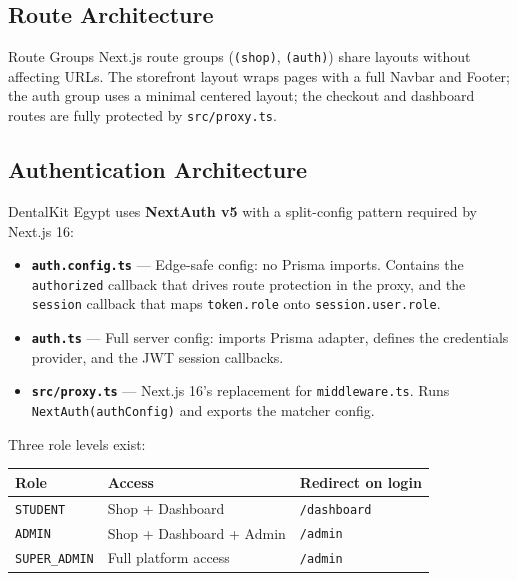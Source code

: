\documentclass[12pt, a4paper]{article}
\begin{document}
\subsection{Route Architecture}

\begin{infobox}{Route Groups}
Next.js route groups (\texttt{(shop)}, \texttt{(auth)}) share layouts without affecting URLs. The storefront layout wraps pages with a full Navbar and Footer; the auth group uses a minimal centered layout; the checkout and dashboard routes are fully protected by \texttt{src/proxy.ts}.
\end{infobox}

\subsection{Authentication Architecture}

DentalKit Egypt uses \textbf{NextAuth v5} with a split-config pattern required by Next.js 16:

\begin{itemize}[leftmargin=*]
  \item \textbf{\texttt{auth.config.ts}} — Edge-safe config: no Prisma imports. Contains the \texttt{authorized} callback that drives route protection in the proxy, and the \texttt{session} callback that maps \texttt{token.role} onto \texttt{session.user.role}.
  \item \textbf{\texttt{auth.ts}} — Full server config: imports Prisma adapter, defines the credentials provider, and the JWT session callbacks.
  \item \textbf{\texttt{src/proxy.ts}} — Next.js 16's replacement for \texttt{middleware.ts}. Runs \texttt{NextAuth(authConfig)} and exports the matcher config.
\end{itemize}

Three role levels exist:

\begin{center}
\begin{tabular}{@{}lll@{}}
\toprule
\textbf{Role}         & \textbf{Access}              & \textbf{Redirect on login} \\
\midrule
\texttt{STUDENT}      & Shop + Dashboard             & \texttt{/dashboard} \\
\texttt{ADMIN}        & Shop + Dashboard + Admin     & \texttt{/admin} \\
\texttt{SUPER\_ADMIN} & Full platform access         & \texttt{/admin} \\
\bottomrule
\end{tabular}
\end{center}
\end{document}
